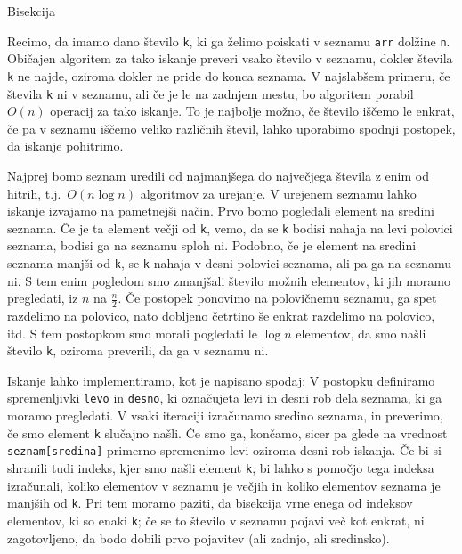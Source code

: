 
Bisekcija


Recimo, da imamo dano število \verb+k+, ki ga želimo poiskati v seznamu
\verb+arr+ dolžine \verb+n+.
Običajen algoritem za tako iskanje preveri vsako število v seznamu, dokler
števila \verb+k+ ne najde, oziroma dokler ne pride do konca seznama.
V najslabšem primeru, če števila \verb+k+ ni v seznamu, ali če je le na zadnjem
mestu, bo algoritem porabil $O(n)$ operacij za tako iskanje.
To je najbolje možno, če število iščemo le enkrat, če pa v seznamu iščemo veliko
različnih števil, lahko uporabimo spodnji postopek, da iskanje pohitrimo.

Najprej bomo seznam uredili od najmanjšega do največjega števila z enim od
hitrih, t.j.~$O(n \log n)$ algoritmov za urejanje.
V urejenem seznamu lahko iskanje izvajamo na pametnejši način.
Prvo bomo pogledali element na sredini seznama.
Če je ta element večji od \verb+k+, vemo, da se \verb+k+ bodisi nahaja na levi
polovici seznama, bodisi ga na seznamu sploh ni.
Podobno, če je element na sredini seznama manjši od \verb+k+, se \verb+k+ nahaja
v desni polovici seznama, ali pa ga na seznamu ni.
S tem enim pogledom smo zmanjšali število možnih elementov, ki jih moramo
pregledati, iz $n$ na $\frac{n}{2}$.
Če postopek ponovimo na polovičnemu seznamu, ga spet razdelimo na polovico, nato
dobljeno četrtino še enkrat razdelimo na polovico, itd.
S tem postopkom smo morali pogledati le $\log n$ elementov, da smo našli število
\verb+k+, oziroma preverili, da ga v seznamu ni.

Iskanje lahko implementiramo, kot je napisano spodaj:
V postopku definiramo spremenljivki \verb+levo+ in \verb+desno+, ki označujeta
levi in desni rob dela seznama, ki ga moramo pregledati.
V vsaki iteraciji izračunamo sredino seznama, in preverimo, če smo element
\verb+k+ slučajno našli.
Če smo ga, končamo, sicer pa glede na vrednost \verb+seznam[sredina]+ primerno
spremenimo levi oziroma desni rob iskanja.
Če bi si shranili tudi indeks, kjer smo našli element \verb+k+, bi lahko s
pomočjo tega indeksa izračunali, koliko elementov v seznamu je večjih in koliko
elementov seznama je manjših od \verb+k+.
Pri tem moramo paziti, da bisekcija vrne enega od indeksov elementov, ki so
enaki \verb+k+; če se to število v seznamu pojavi več kot enkrat, ni
zagotovljeno, da bodo dobili prvo pojavitev (ali zadnjo, ali sredinsko).

